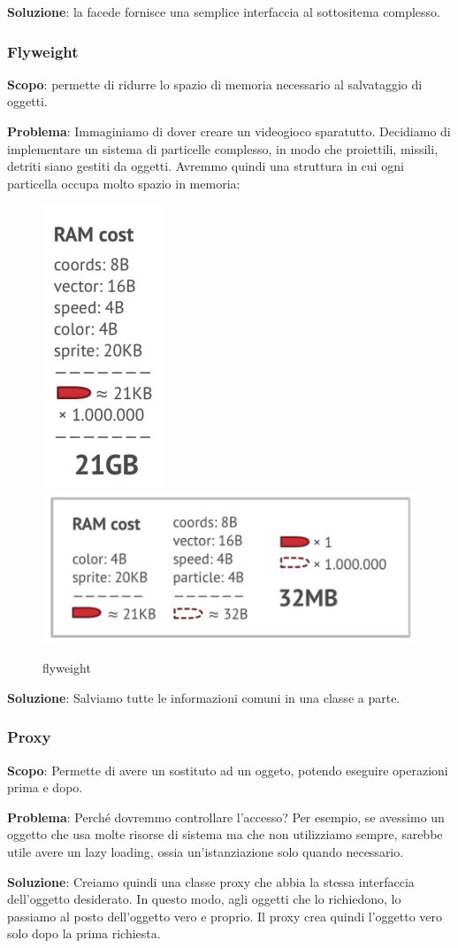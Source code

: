 \documentclass{article}
\begin{document}
\textbf{Soluzione}: la facede fornisce una semplice interfaccia al sottositema complesso.

\subsubsection{Flyweight}
\textbf{Scopo}: permette di ridurre lo spazio di memoria necessario al salvataggio di oggetti.

\textbf{Problema}: Immaginiamo di dover creare un videogioco sparatutto. Decidiamo di implementare un sistema
di particelle complesso, in modo che proiettili, missili, detriti siano gestiti da oggetti. Avremmo quindi
una struttura in cui ogni particella occupa molto spazio in memoria:

\begin{figure}[h!]
    \centering
    \includegraphics[height=0.2\linewidth]{imgs/9 - flyweight.png}
    \includegraphics[width=0.4\linewidth]{imgs/10 - flyweigth 2.png}
    \label{fig:flyweight}
    \caption{flyweight}
\end{figure}


\textbf{Soluzione}: Salviamo tutte le informazioni comuni in una classe a parte.


\subsubsection{Proxy}
\textbf{Scopo}: Permette di avere un sostituto ad un oggeto, potendo eseguire operazioni prima e dopo.

\textbf{Problema}: Perché dovremmo controllare l'accesso? Per esempio, se avessimo un oggetto che usa molte
risorse di sistema ma che non utilizziamo sempre, sarebbe utile avere un lazy loading, ossia un'istanziazione
solo quando necessario.


\textbf{Soluzione}: Creiamo quindi una classe proxy che abbia la stessa interfaccia dell'oggetto desiderato. In
questo modo, agli oggetti che lo richiedono, lo passiamo al posto dell'oggetto vero e proprio. Il proxy 
crea quindi l'oggetto vero solo dopo la prima richiesta.
\end{document}
